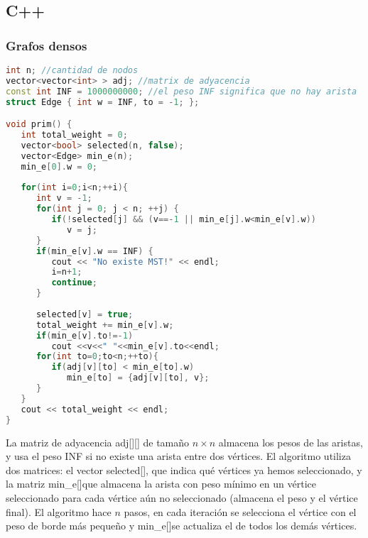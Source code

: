 \subsection{C++}

\subsubsection{Grafos densos}
\begin{lstlisting}[language=C++]
int n; //cantidad de nodos
vector<vector<int> > adj; //matrix de adyacencia
const int INF = 1000000000; //el peso INF significa que no hay arista
struct Edge { int w = INF, to = -1; };

void prim() {
   int total_weight = 0;
   vector<bool> selected(n, false);
   vector<Edge> min_e(n);
   min_e[0].w = 0;
	
   for(int i=0;i<n;++i){
      int v = -1;
      for(int j = 0; j < n; ++j) {
         if(!selected[j] && (v==-1 || min_e[j].w<min_e[v].w))
            v = j;
      }
      if(min_e[v].w == INF) {
         cout << "No existe MST!" << endl;
         i=n+1;
         continue;
      }
      
      selected[v] = true;
      total_weight += min_e[v].w;
      if(min_e[v].to!=-1)
         cout <<v<<" "<<min_e[v].to<<endl;
      for(int to=0;to<n;++to){
         if(adj[v][to] < min_e[to].w)
            min_e[to] = {adj[v][to], v};
      }
   }
   cout << total_weight << endl;
}
\end{lstlisting}

La matriz de adyacencia adj[][] de tamaño $n\times n$ almacena los pesos de las aristas, y usa el peso INF si no existe una arista entre dos vértices. El algoritmo utiliza dos matrices: el vector selected[], que indica qué vértices ya hemos seleccionado, y la matriz min\_e[]que almacena la arista con peso mínimo en un vértice seleccionado para cada vértice aún no seleccionado (almacena el peso y el vértice final). El algoritmo hace $n$ pasos, en cada iteración se selecciona el vértice con el peso de borde más pequeño y min\_e[]se actualiza el de todos los demás vértices.

